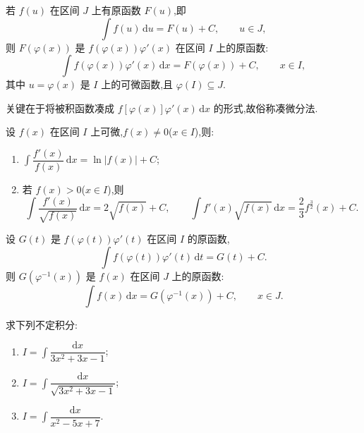 \begin{theorem}[第一积分换元法]
    若 $f(u)$ 在区间 $J$ 上有原函数 $F(u)$,即
    \[
        \int f(u)\,\mathrm{d}u=F(u)+C,
        \qquad u\in J,
    \]
    则 $F(\varphi(x))$ 是 $f(\varphi(x))\varphi'(x)$ 在区间 $I$ 上的原函数:
    \[
        \int f(\varphi(x))\varphi'(x)\,\mathrm{d}x
        =F(\varphi(x))+C,
        \qquad x\in I,
    \]
    其中 $u=\varphi(x)$ 是 $I$ 上的可微函数,且 $\varphi(I)\subseteq J$.
\end{theorem}

\begin{remark}
    关键在于将被积函数凑成 $f[\varphi(x)]\varphi'(x)\,\mathrm{d}x$ 的形式,故俗称凑微分法.
\end{remark}

\begin{corollary}[\markstar]
    设 $f(x)$ 在区间 $I$ 上可微,$f(x)\neq0$($x\in I$),则:
    \begin{enumerate}
        \item $\displaystyle\int\dfrac{f'(x)}{f(x)}\,\mathrm{d}x=\ln|f(x)|+C$;
        \item 若 $f(x)>0$($x\in I$),则
              \[
                  \int\dfrac{f'(x)}{\sqrt{f(x)}}\,\mathrm{d}x=2\sqrt{f(x)}+C,
                  \qquad
                  \int f'(x)\sqrt{f(x)}\,\mathrm{d}x
                  =\dfrac{2}{3}f^{\frac{3}{2}}(x)+C.
              \]
    \end{enumerate}
\end{corollary}

\begin{theorem}[第二积分换元法]
    设 $G(t)$ 是 $f(\varphi(t))\varphi'(t)$ 在区间 $I$ 的原函数,
    \[
        \int f(\varphi(t))\varphi'(t)\,\mathrm{d}t=G(t)+C.
    \]
    则 $G(\varphi^{-1}(x))$ 是 $f(x)$ 在区间 $J$ 上的原函数:
    \[
        \int f(x)\,\mathrm{d}x=G(\varphi^{-1}(x))+C,
        \qquad x\in J.
    \]
\end{theorem}

\begin{example}
    求下列不定积分:
    \begin{enumerate}
        \item $\displaystyle I=\int\dfrac{\mathrm{d}x}{3x^2+3x-1}$;
        \item $\displaystyle I=\int\dfrac{\mathrm{d}x}{\sqrt{3x^2+3x-1}}$;
        \item $\displaystyle I=\int\dfrac{\mathrm{d}x}{x^2-5x+7}$.
    \end{enumerate}
\end{example}
\exampleblank

